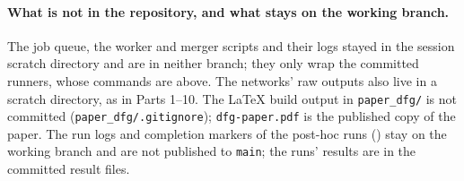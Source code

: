 \paragraph{What is not in the repository, and what stays on the working branch.} The job queue, the worker and merger scripts and their logs stayed in the session scratch directory and are in neither branch; they only wrap the committed runners, whose commands are above. The networks' raw outputs also live in a scratch directory, as in Parts 1--10. The LaTeX build output in \texttt{paper\_dfg/} is not committed (\texttt{paper\_dfg/.gitignore}); \texttt{dfg-paper.pdf} is the published copy of the paper. The run logs and completion markers of the post-hoc runs () stay on the working branch and are not published to \texttt{main}; the runs' results are in the committed result files.
